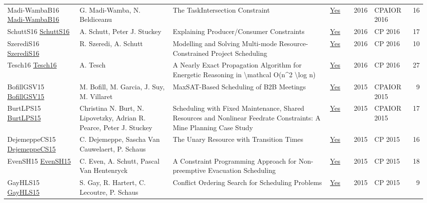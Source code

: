 {\begin{longtable}{p{3cm}p{6cm}p{7cm}rrrp{3cm}r}
Madi-WambaB16 \href{https://doi.org/10.1007/978-3-319-33954-2\_18}{Madi-WambaB16} & G. Madi{-}Wamba, N. Beldiceanu & The TaskIntersection Constraint & \href{papers/Madi-WambaB16.pdf}{Yes} & \cite{Madi-WambaB16} & 2016 & CPAIOR 2016 & 16\\
SchuttS16 \href{https://doi.org/10.1007/978-3-319-44953-1\_28}{SchuttS16} & A. Schutt, Peter J. Stuckey & Explaining Producer/Consumer Constraints & \href{papers/SchuttS16.pdf}{Yes} & \cite{SchuttS16} & 2016 & CP 2016 & 17\\
SzerediS16 \href{https://doi.org/10.1007/978-3-319-44953-1\_31}{SzerediS16} & R. Szeredi, A. Schutt & Modelling and Solving Multi-mode Resource-Constrained Project Scheduling & \href{papers/SzerediS16.pdf}{Yes} & \cite{SzerediS16} & 2016 & CP 2016 & 10\\
Tesch16 \href{https://doi.org/10.1007/978-3-319-44953-1\_32}{Tesch16} & A. Tesch & A Nearly Exact Propagation Algorithm for Energetic Reasoning in {\textbackslash}mathcal O(n{\^{}}2 {\textbackslash}log n) & \href{papers/Tesch16.pdf}{Yes} & \cite{Tesch16} & 2016 & CP 2016 & 27\\
BofillGSV15 \href{https://doi.org/10.1007/978-3-319-18008-3\_5}{BofillGSV15} & M. Bofill, M. Garcia, J. Suy, M. Villaret & MaxSAT-Based Scheduling of {B2B} Meetings & \href{papers/BofillGSV15.pdf}{Yes} & \cite{BofillGSV15} & 2015 & CPAIOR 2015 & 9\\
BurtLPS15 \href{https://doi.org/10.1007/978-3-319-18008-3\_7}{BurtLPS15} & Christina N. Burt, N. Lipovetzky, Adrian R. Pearce, Peter J. Stuckey & Scheduling with Fixed Maintenance, Shared Resources and Nonlinear Feedrate Constraints: {A} Mine Planning Case Study & \href{papers/BurtLPS15.pdf}{Yes} & \cite{BurtLPS15} & 2015 & CPAIOR 2015 & 17\\
DejemeppeCS15 \href{https://doi.org/10.1007/978-3-319-23219-5\_7}{DejemeppeCS15} & C. Dejemeppe, Sascha Van Cauwelaert, P. Schaus & The Unary Resource with Transition Times & \href{papers/DejemeppeCS15.pdf}{Yes} & \cite{DejemeppeCS15} & 2015 & CP 2015 & 16\\
EvenSH15 \href{https://doi.org/10.1007/978-3-319-23219-5\_40}{EvenSH15} & C. Even, A. Schutt, Pascal Van Hentenryck & A Constraint Programming Approach for Non-preemptive Evacuation Scheduling & \href{papers/EvenSH15.pdf}{Yes} & \cite{EvenSH15} & 2015 & CP 2015 & 18\\
GayHLS15 \href{https://doi.org/10.1007/978-3-319-23219-5\_10}{GayHLS15} & S. Gay, R. Hartert, C. Lecoutre, P. Schaus & Conflict Ordering Search for Scheduling Problems & \href{papers/GayHLS15.pdf}{Yes} & \cite{GayHLS15} & 2015 & CP 2015 & 9\\

\end{longtable}}
